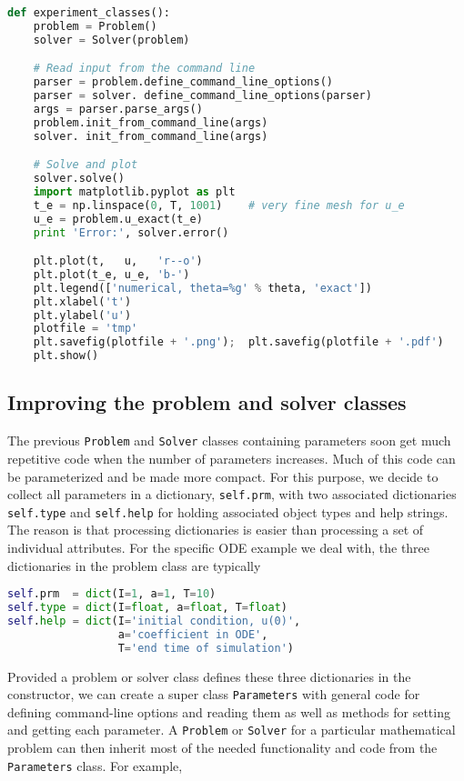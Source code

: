 \documentclass[graybox,sectrefs,envcountresetchap,open=right,final]{svmonodo}
\begin{document}
\begin{lstlisting}[language=Python,style=blue1_bluegreen]
def experiment_classes():
    problem = Problem()
    solver = Solver(problem)

    # Read input from the command line
    parser = problem.define_command_line_options()
    parser = solver. define_command_line_options(parser)
    args = parser.parse_args()
    problem.init_from_command_line(args)
    solver. init_from_command_line(args)

    # Solve and plot
    solver.solve()
    import matplotlib.pyplot as plt
    t_e = np.linspace(0, T, 1001)    # very fine mesh for u_e
    u_e = problem.u_exact(t_e)
    print 'Error:', solver.error()

    plt.plot(t,   u,   'r--o')
    plt.plot(t_e, u_e, 'b-')
    plt.legend(['numerical, theta=%g' % theta, 'exact'])
    plt.xlabel('t')
    plt.ylabel('u')
    plotfile = 'tmp'
    plt.savefig(plotfile + '.png');  plt.savefig(plotfile + '.pdf')
    plt.show()
\end{lstlisting}


\subsection{Improving the problem and solver classes}
\label{softeng1:prog:se:class2}

The previous \texttt{Problem} and \texttt{Solver} classes containing parameters
soon get much repetitive code when the number of parameters increases.
Much of this code can be parameterized and be made more compact.
For this purpose, we decide to collect all parameters in a dictionary,
\texttt{self.prm}, with two associated dictionaries \texttt{self.type} and
\texttt{self.help} for holding associated object types and help strings.
The reason is that processing dictionaries is easier than processing
a set of individual attributes.
For the specific ODE example we deal with, the three dictionaries in
the problem class are typically

\begin{lstlisting}[language=Python,style=blue1_bluegreen]
self.prm  = dict(I=1, a=1, T=10)
self.type = dict(I=float, a=float, T=float)
self.help = dict(I='initial condition, u(0)',
                 a='coefficient in ODE',
                 T='end time of simulation')
\end{lstlisting}
Provided a problem or solver class defines these three
dictionaries in the constructor,
we can create a super class \texttt{Parameters} with general code
for defining command-line options and reading them as well as
methods for setting and getting each parameter. A \texttt{Problem} or \texttt{Solver} for
a particular mathematical problem can then
inherit most of the needed functionality and code
from the \texttt{Parameters} class. For example,
\end{document}
